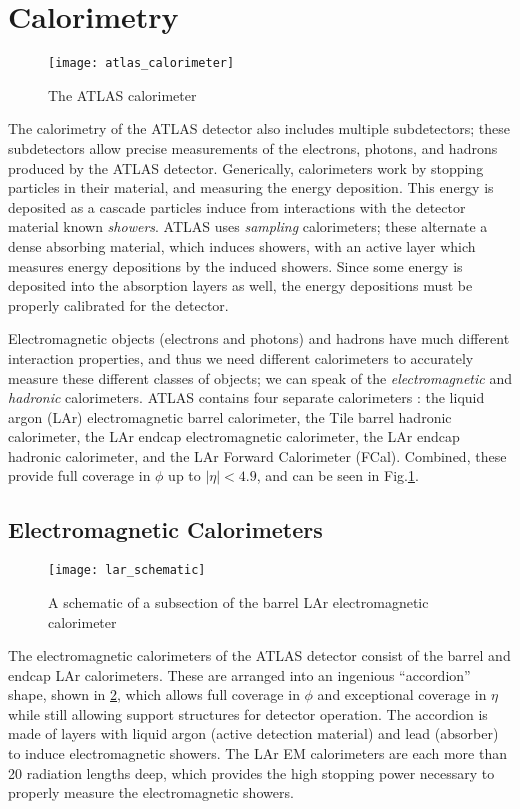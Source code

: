 \section{Calorimetry}
\begin{figure}
\caption{The ATLAS calorimeter} \label{fig:atlas_calorimeter}
\texttt{[image: atlas\_calorimeter]}
\end{figure}

The calorimetry of the ATLAS detector also includes multiple subdetectors; these subdetectors allow precise measurements of the electrons, photons, and hadrons produced by the ATLAS detector.
Generically, calorimeters work by stopping particles in their material, and measuring the energy deposition.
This energy is deposited as a cascade particles induce from interactions with the detector material known \textit{showers}.
ATLAS uses \textit{sampling} calorimeters; these alternate a dense absorbing material, which induces showers, with an active layer which measures energy depositions by the induced showers.
Since some energy is deposited into the absorption layers as well, the energy depositions must be properly calibrated for the detector.

Electromagnetic objects (electrons and photons) and hadrons have much different interaction properties, and thus we need different calorimeters to accurately measure these different classes of objects; we can speak of the \textit{electromagnetic} and \textit{hadronic} calorimeters.
ATLAS contains four separate calorimeters : the liquid argon (LAr) electromagnetic barrel calorimeter, the Tile barrel hadronic calorimeter, the LAr endcap electromagnetic calorimeter, the LAr endcap hadronic calorimeter, and the LAr Forward Calorimeter (FCal).
Combined, these provide full coverage in $\phi$ up to $|\eta| <4.9$, and can be seen in Fig.\ref{fig:atlas_calorimeter}.

\subsection{Electromagnetic Calorimeters}
\begin{figure}
\caption{A schematic of a subsection of the barrel LAr electromagnetic calorimeter} \label{fig:lar_schematic}
\texttt{[image: lar\_schematic]}
\end{figure}

The electromagnetic calorimeters of the ATLAS detector consist of the barrel and endcap LAr calorimeters.
These are arranged into an ingenious ``accordion'' shape, shown in \ref{fig:lar_schematic}, which allows full coverage in $\phi$ and exceptional coverage in $\eta$ while still allowing support structures for detector operation.
The accordion is made of layers with liquid argon (active detection material) and lead (absorber) to induce electromagnetic showers.
The LAr EM calorimeters are each more than 20 radiation lengths deep, which provides the high stopping power necessary to properly measure the electromagnetic showers.

